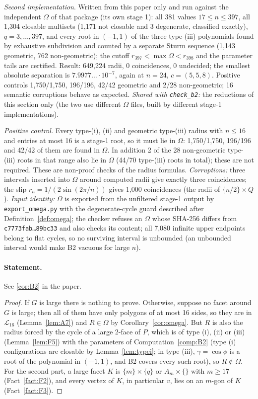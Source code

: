 \documentclass[11pt]{article}
\theoremstyle{definition}
\theoremstyle{remark}
\begin{document}
\noindent\emph{Second implementation}. Written from
this paper only and run against the independent $\Omega$ of that package
(its own stage 1): all 381 values $17\le n\le397$, all 1,304 closable
multisets (1,171 not closable and 3 degenerate, classified exactly),
$q=3,\dots,397$, and every root in $(-1,1)$ of the three type-(iii)
polynomials found by exhaustive subdivision and counted by a separate
Sturm sequence (1,143 geometric, 762 non-geometric); the cutoff
$r_{397}<\max\Omega<r_{398}$ and the parameter tails are certified.
Result: 649,224 radii, 0 coincidences, 0 undecided; the smallest absolute
separation is $7.9977\ldots\cdot10^{-7}$, again at $n=24$, $c=(5,5,8)$.
Positive controls 1,750/1,750, 196/196, 42/42 geometric and 2/28
non-geometric; 16 semantic corruptions behave as expected. \emph{Shared with
\texttt{check\_b2}:} the reductions of this section only (the two use different
$\Omega$ files, built by different stage-1 implementations).

\noindent\emph{Positive control.} Every type-(i), (ii) and geometric
type-(iii) radius with $n\le16$ and entries at most 16 is a stage-1 root,
so it must lie in $\Omega$: 1,750/1,750, 196/196 and 42/42 of them are found
in $\Omega$. In addition 2 of the 28 non-geometric type-(iii) roots in that
range also lie in $\Omega$ (44/70 type-(iii) roots in total); these are not
required. These are non-proof checks of the radius formulas.
\emph{Corruptions:} three intervals inserted into $\Omega$ around computed
radii give exactly three coincidences; the slip $r_n=1/(2\sin(2\pi/n))$
gives 1,000 coincidences (the radii of $\{n/2\}\times Q$).
\emph{Input identity:} $\Omega$ is exported from the unfiltered stage-1
output by \texttt{export\_omega.py} with the degenerate-cycle guard
described after Definition~\ref{def:omega}; the checker refuses an $\Omega$
whose SHA-256 differs from \texttt{c7773fab\ldots89bc33} and also checks its
content; all 7,080 infinite upper endpoints belong to flat cycles, so no
surviving interval is unbounded (an unbounded interval would make B2
vacuous for large $n$).

\noindent
\paragraph{Statement.} See \ref{cor:B2} in the paper.

\begin{proof}
If $G$ is large there is nothing to prove. Otherwise, suppose no facet
around $G$ is large; then all of them have only polygons of at most 16
sides, so they are in $\mathcal L_{16}$ (Lemma~\ref{lem:A7}) and $R\in\Omega$
by Corollary~\ref{cor:omega}. But $R$ is also the radius forced by the cycle
of a large 2-face of $P$, which is of type (i), (ii) or (iii)
(Lemma~\ref{lem:F5}) with the parameters of Computation~\ref{comp:B2}
(type (i) configurations are closable by Lemma~\ref{lem:typei}; in type
(iii), $\gamma=\cos\phi$ is a root of the polynomial in $(-1,1)$, and B2
covers every such root), so $R\notin\Omega$. For the second part, a large facet $K$ is $\{m\}\times\{q\}$
or $A_m\times\{\}$ with $m\ge17$ (Fact~\ref{fact:F2}), and every vertex of
$K$, in particular $v$, lies on an $m$-gon of $K$ (Fact~\ref{fact:F3}).
\end{proof}
\end{document}
